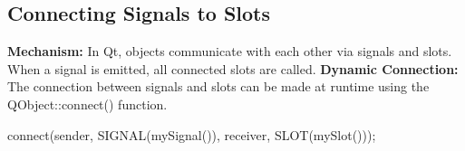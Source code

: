 \documentclass{report}
\begin{document}
    \pagebreak 
    \subsection*{Connecting Signals to Slots}
    \bigbreak \noindent 
    \textbf{Mechanism:} In Qt, objects communicate with each other via signals and slots. When a signal is emitted, all connected slots are called.
    \bigbreak \noindent 
    \textbf{Dynamic Connection:} The connection between signals and slots can be made at runtime using the QObject::connect() function.
    \bigbreak \noindent 
    \begin{cppcode}
    connect(sender, SIGNAL(mySignal()), receiver, SLOT(mySlot()));
    \end{cppcode}

    \bigbreak \noindent 
\end{document}
